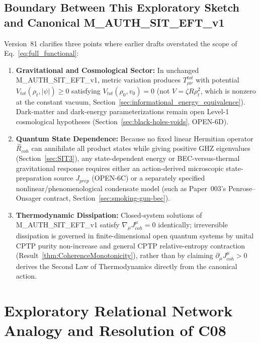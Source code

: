 \documentclass[american,11pt,letterpaper]{article}
\def\mathcal#1{#1}%
\def\mathrm#1{#1}%
\def\texttt#1{#1}%
\begin{document}
\subsection{Boundary Between This Exploratory Sketch and Canonical \texttt{M\_AUTH\_SIT\_EFT\_v1}}
Version~81 clarifies three points where earlier drafts overstated the scope of Eq.~\eqref{eq:full_functional}:
\begin{enumerate}[leftmargin=2em]
  \item \textbf{Gravitational and Cosmological Sector:} In unchanged \texttt{M\_AUTH\_SIT\_EFT\_v1}, metric variation produces $T_{\mu\nu}^{\mathrm{tot}}$ with potential $V_{\mathrm{tot}}(\rho_t, |\psi|) \ge 0$ satisfying $V_{\mathrm{tot}}(\rho_0, v_0) = 0$ (not $V = \zeta R\rho_t^2$, which is nonzero at the constant vacuum, Section~\ref{sec:informational_energy_equivalence}). Dark-matter and dark-energy parameterizations remain open Level-1 cosmological hypotheses (Section~\ref{sec:black-holes-voids}, \texttt{OPEN-6D}).
  \item \textbf{Quantum State Dependence:} Because no fixed linear Hermitian operator $\hat{\mathcal{R}}_{\mathrm{coh}}$ can annihilate all product states while giving positive GHZ eigenvalues (Section~\ref{sec:SIT3}), any state-dependent energy or BEC-versus-thermal gravitational response requires either an action-derived microscopic state-preparation source $J_{\mathrm{prep}}$ (\texttt{OPEN-6C}) or a separately specified nonlinear/phenomenological condensate model (such as Paper~003's Penrose--Onsager contract, Section~\ref{sec:smoking-gun-bec}).
  \item \textbf{Thermodynamic Dissipation:} Closed-system solutions of \texttt{M\_AUTH\_SIT\_EFT\_v1} satisfy $\nabla_\mu J^\mu_{\mathrm{coh}} = 0$ identically; irreversible dissipation is governed in finite-dimensional open quantum systems by unital CPTP purity non-increase and general CPTP relative-entropy contraction (Result~\ref{thm:CoherenceMonotonicity}), rather than by claiming $\partial_\mu J^\mu_{\mathrm{coh}} > 0$ derives the Second Law of Thermodynamics directly from the canonical action.
\end{enumerate}



\section{Exploratory Relational Network Analogy and Resolution of \texttt{C08}}
\label{sec:network-formulation}
\end{document}
